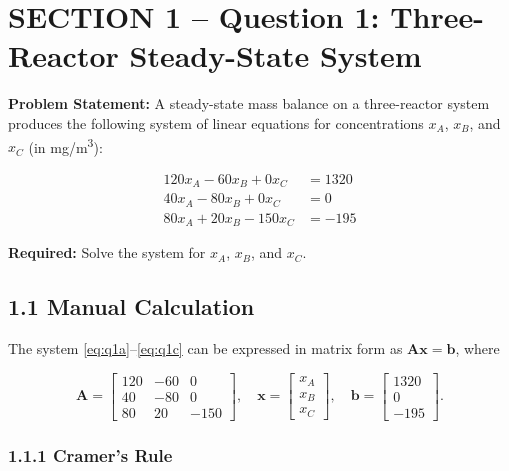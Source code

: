 \documentclass[12pt,a4paper]{article}
\begin{document}
\newpage

\section{SECTION 1 -- Question 1: Three-Reactor Steady-State System}

\textbf{Problem Statement:} A steady-state mass balance on a three-reactor system produces the
following system of linear equations for concentrations $x_A$, $x_B$, and $x_C$ (in mg/m\textsuperscript{3}):

\begin{align}
  120x_A - 60x_B + 0x_C &= 1320 \label{eq:q1a}\\
  40x_A - 80x_B + 0x_C &= 0 \label{eq:q1b}\\
  80x_A + 20x_B - 150x_C &= -195 \label{eq:q1c}
\end{align}

\textbf{Required:} Solve the system for $x_A$, $x_B$, and $x_C$.

\subsection{1.1 Manual Calculation}

The system \eqref{eq:q1a}--\eqref{eq:q1c} can be expressed in matrix form as
$\mathbf{A}\mathbf{x} = \mathbf{b}$, where

\[
\mathbf{A} = \begin{bmatrix} 120 & -60 & 0 \\ 40 & -80 & 0 \\ 80 & 20 & -150 \end{bmatrix},
\quad
\mathbf{x} = \begin{bmatrix} x_A \\ x_B \\ x_C \end{bmatrix},
\quad
\mathbf{b} = \begin{bmatrix} 1320 \\ 0 \\ -195 \end{bmatrix}.
\]

\subsubsection{1.1.1 Cramer's Rule}
\end{document}
